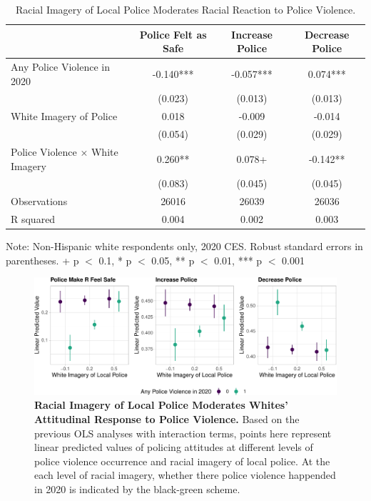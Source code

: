 \documentclass[
  12pt,
]{article}
\begin{document}
\hypertarget{tbl-reaction}{}
\begin{table}
\caption{\label{tbl-reaction}Racial Imagery of Local Police Moderates Racial Reaction to Police
Violence. }\tabularnewline

\centering
\begin{threeparttable}
\begin{tabular}[t]{lccc}
\toprule
  & Police Felt as Safe & Increase Police & Decrease Police\\
\midrule
Any Police Violence in 2020 & -0.140*** & -0.057*** & 0.074***\\
 & (0.023) & (0.013) & (0.013)\\
White Imagery of Police & 0.018 & -0.009 & -0.014\\
 & (0.054) & (0.029) & (0.029)\\
Police Violence × White Imagery & 0.260** & 0.078+ & -0.142**\\
 & (0.083) & (0.045) & (0.045)\\
\midrule
Observations & 26016 & 26039 & 26036\\
R squared & 0.004 & 0.002 & 0.003\\
\bottomrule
\end{tabular}
\begin{tablenotes}
\item Note: Non-Hispanic white respondents only, 2020 CES. Robust standard errors in parentheses. + p $<$ 0.1, * p $<$ 0.05, ** p $<$ 0.01, *** p $<$ 0.001
\end{tablenotes}
\end{threeparttable}
\end{table}

\begin{figure}[tb]

{\centering \includegraphics{quarto_files/figure-pdf/fig-reaction-mod-1.pdf}

}

\caption{\label{fig-reaction-mod}\textbf{Racial Imagery of Local Police
Moderates Whites' Attitudinal Response to Police Violence.} Based on the
previous OLS analyses with interaction terms, points here represent
linear predicted values of policing attitudes at different levels of
police violence occurrence and racial imagery of local police. At the
each level of racial imagery, whether there police violence happended in
2020 is indicated by the black-green scheme.}

\end{figure}
\end{document}

